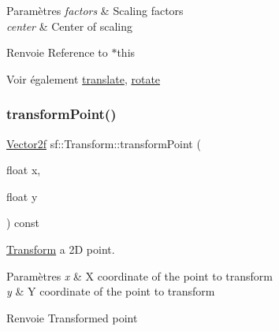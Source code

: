 \begin{DoxyParams}{Paramètres}
{\em factors} & Scaling factors \\
\hline
{\em center} & Center of scaling\\
\hline
\end{DoxyParams}
\begin{DoxyReturn}{Renvoie}
Reference to $\ast$this
\end{DoxyReturn}
\begin{DoxySeeAlso}{Voir également}
\hyperlink{classsf_1_1Transform_ab54f6c8070cc05e2afcb3145fbf4395a}{translate}, \hyperlink{classsf_1_1Transform_a3e548c3c9e3fb9d4bd43cf852669e555}{rotate} 
\end{DoxySeeAlso}
\mbox{\label{classsf_1_1Transform_af2e38c3c077d28898686662558b41135}} 
\subsubsection{\texorpdfstring{transform\+Point()}{transformPoint()}\hspace{0.1cm}{\footnotesize\ttfamily [1/2]}}
{\footnotesize\ttfamily \hyperlink{classsf_1_1Vector2}{Vector2f} sf\+::\+Transform\+::transform\+Point (\begin{DoxyParamCaption}\item[{float}]{x,  }\item[{float}]{y }\end{DoxyParamCaption}) const}



\hyperlink{classsf_1_1Transform}{Transform} a 2D point. 


\begin{DoxyParams}{Paramètres}
{\em x} & X coordinate of the point to transform \\
\hline
{\em y} & Y coordinate of the point to transform\\
\hline
\end{DoxyParams}
\begin{DoxyReturn}{Renvoie}
Transformed point 
\end{DoxyReturn}
\mbox{\label{classsf_1_1Transform_ab42a0bb7a252c6d221004f6372ce5fdc}} 
